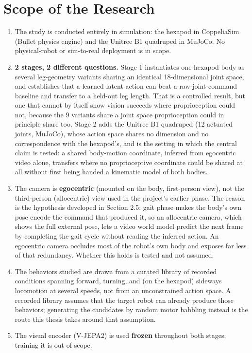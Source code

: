 \documentclass[12pt,a4paper,oneside]{report}
\begin{document}
\section{Scope of the Research}
\begin{enumerate}[label=\arabic*.]
\item The study is conducted entirely in simulation: the hexapod in CoppeliaSim (Bullet physics engine)
  and the Unitree B1 quadruped in MuJoCo. No physical-robot or sim-to-real deployment is in scope.
\item \textbf{2 stages, 2 different questions.} Stage 1 instantiates one hexapod body as several leg-geometry
  variants sharing an identical 18-dimensional joint space, and establishes that a learned latent
  action can beat a raw-joint-command baseline and transfer to a held-out leg length. That is a controlled result,
  but one that cannot by itself show vision succeeds where proprioception could not, because the 9 variants share
  a joint space proprioception could in principle share too. Stage 2 adds the Unitree B1 quadruped (12 actuated
  joints, MuJoCo), whose action space shares no dimension and no correspondence with the hexapod's, and is the
  setting in which the central claim is tested: a shared body-motion coordinate, inferred from egocentric video
  alone, transfers where no proprioceptive coordinate could be shared at all without first being handed a
  kinematic model of both bodies.
\item The camera is \textbf{egocentric} (mounted on the body, first-person view), not the third-person (allocentric) view used in the project's earlier phase. The reason is the hypothesis developed in Section 2.5: gait phase makes the body's own pose encode the command that produced it, so an allocentric camera, which shows the full external pose, lets a video world model predict the next frame by completing the gait cycle without reading the inferred action. An egocentric camera occludes most of the robot's own body and exposes far less of that redundancy. Whether this holds is tested and not assumed.
\item The behaviors studied are drawn from a curated library of recorded conditions spanning forward, turning,
  and (on the hexapod) sideways locomotion at several speeds, not from an unconstrained action space. A recorded library assumes that the target robot can already produce those
  behaviors; generating the candidates by random motor babbling instead is the route this thesis takes around that
  assumption.
\item The visual encoder (V-JEPA2) is used \textbf{frozen} throughout both stages; training it is out of scope.

\end{enumerate}
\end{document}
